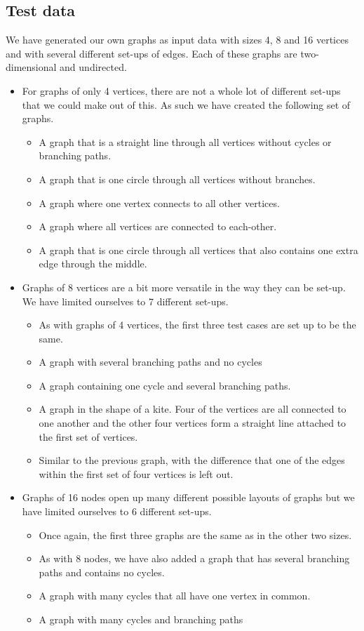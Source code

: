\documentclass[a4paper,12pt]{article}
\begin{document}
\subsection{Test data}
We have generated our own graphs as input data with sizes 4, 8 and 16 vertices and with several different set-ups of edges. Each of these graphs are two-dimensional and undirected.
\begin{itemize}
\item For graphs of only 4 vertices, there are not a whole lot of different set-ups that we could make out of this. As such we have created the following set of graphs.
\begin{itemize}
\item A graph that is a straight line through all vertices without cycles or branching paths.
\item A graph that is one circle through all vertices without branches.
\item A graph where one vertex connects to all other vertices.
\item A graph where all vertices are connected to each-other.
\item A graph that is one circle through all vertices that also contains one extra edge through the middle.
\end{itemize}
\item Graphs of 8 vertices are a bit more versatile in the way they can be set-up. We have limited ourselves to 7 different set-ups.
\begin{itemize}
\item As with graphs of 4 vertices, the first three test cases are set up to be the same.
\item A graph with several branching paths and no cycles
\item A graph containing one cycle and several branching paths.
\item A graph in the shape of a kite. Four of the vertices are all connected to one another and the other four vertices form a straight line attached to the first set of vertices.
\item Similar to the previous graph, with the difference that one of the edges within the first set of four vertices is left out.
\end{itemize}
\item Graphs of 16 nodes open up many different possible layouts of graphs but we have limited ourselves to 6 different set-ups.
\begin{itemize}
\item Once again, the first three graphs are the same as in the other two sizes.
\item As with 8 nodes, we have also added a graph that has several branching paths and contains no cycles.
\item A graph with many cycles that all have one vertex in common.
\item A graph with many cycles and branching paths
\end{itemize}
\end{itemize}
\end{document}
